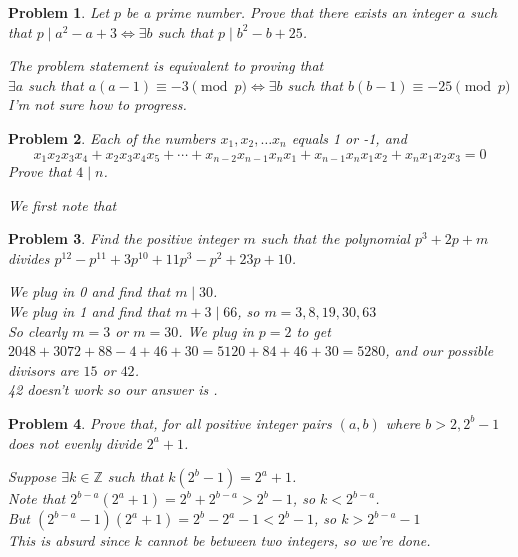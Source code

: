\documentclass{scrartcl}
\newtheorem{a_problem}{Problem}
\begin{document}
\begin{a_problem}
	Let $p$ be a prime number. Prove that there exists an integer $a$ such that $p \mid a^2 - a + 3 \iff \exists b$ such that $p \mid b^2 - b + 25$.
	\begin{soln}
		The problem statement is equivalent to proving that \\
		$\exists a$ such that $a(a-1) \equiv -3 \pmod{p} \iff \exists b$ such that $b(b-1) \equiv -25 \pmod{p}$ \\
		I'm not sure how to progress.
	\end{soln}
\end{a_problem}

\begin{a_problem}
	Each of the numbers $x_1, x_2,\dots x_n$ equals 1 or -1, and
	\[x_1x_2x_3x_4 + x_2x_3x_4x_5 + \cdots + x_{n-2}x_{n-1}x_nx_1 + x_{n-1}x_nx_1x_2 + x_nx_1x_2x_3 = 0\]
	Prove that $4 \mid n$.
	\begin{soln}
		We first note that
	\end{soln}
\end{a_problem}

\setcounter{a_problem}{397}
\begin{a_problem}
Find the positive integer $m$ such that the polynomial $p^3 + 2p + m$ divides $p^{12} - p^{11} + 3p^{10} + 11p^3 - p^2 + 23p + 10$.
	\begin{soln}
		We plug in 0 and find that $m \mid 30$. \\
		We plug in 1 and find that $m + 3 \mid 66$, so $m = 3,8,19,30,63$ \\
		So clearly $m = 3$ or $m = 30$.
		We plug in $p=2$ to get $2048 + 3072 + 88 - 4 + 46 + 30 = 5120 + 84 + 46 + 30 = 5280$, and our possible divisors are $15$ or $42$. \\
		42 doesn't work so our answer is .
	\end{soln}
\end{a_problem}
\begin{a_problem}
	Prove that, for all positive integer pairs $(a,b)$ where $b>2, 2^b - 1$ does not evenly divide $2^a + 1$.
	\begin{soln}
		Suppose $\exists k \in \mathbb{Z}$ such that $k(2^b - 1) = 2^a + 1$. \\
		Note that $2^{b-a}\left( 2^a +1\right) = 2^b + 2^{b-a} > 2^b - 1$, so $k < 2^{b-a}$. \\
		But $\left(2^{b-a} - 1\right)\left(2^a + 1\right) = 2^b - 2^a - 1 < 2^b - 1$, so $k > 2^{b-a}-1$ \\
		This is absurd since $k$ cannot be between two integers, so we're done.

	\end{soln}
\end{a_problem}
\end{document}
